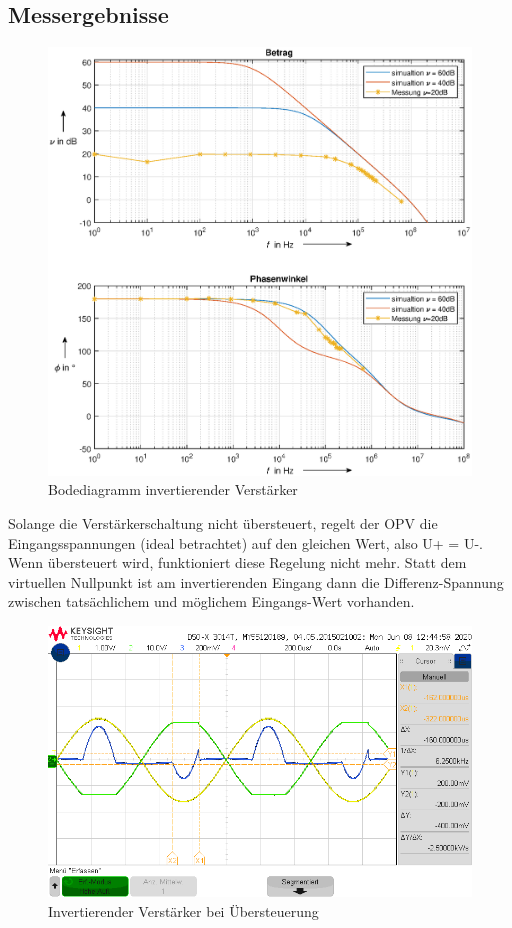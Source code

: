 \subsection{Messergebnisse}
\begin{figure}[H]
    \centering
    \includegraphics[width=\costumPicWidth]{Lab_1/Plots/inv_verst.eps}
    \caption{Bodediagramm invertierender Verstärker}
    \label{fig:bode_inv_verst}
\end{figure}

Solange die Verstärkerschaltung nicht übersteuert, regelt der OPV die Eingangsspannungen (ideal betrachtet) auf
den gleichen Wert, also U+ = U-. Wenn übersteuert wird, funktioniert diese Regelung nicht mehr. Statt dem
virtuellen Nullpunkt ist am invertierenden Eingang dann die Differenz-Spannung zwischen tatsächlichem und
möglichem Eingangs-Wert vorhanden.
\begin{figure}[H]
    \centering
    \includegraphics[width=\costumPicWidth]{Lab_1/Messungen/inv_verst/scope_40.png}
    \caption{Invertierender Verstärker bei Übersteuerung}
    \label{fig:uberst_verst}
\end{figure}
